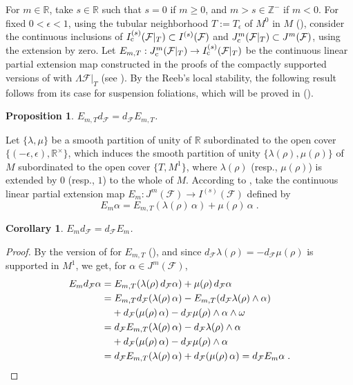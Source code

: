 \documentclass{memo-l}
\theoremstyle{plain}
\newtheorem{cor}[thm]{Corollary}
\newtheorem{prop}[thm]{Proposition}
\theoremstyle{definition}
\theoremstyle{remark}
\newcommand{\R}{\mathbb{R}}
\newcommand{\Z}{\mathbb{Z}}
\newcommand{\FF}{\mathcal{F}}
\newcommand{\co}{{\text{\rm c}}}
\numberwithin{section}{chapter}
\numberwithin{equation}{section}%
\begin{document}
For $m\in\R$, take $s\in\R$ such that $s=0$ if $m\ge0$, and $m>s\in\Z^-$ if $m<0$. For fixed $0<\epsilon<1$, using the tubular neighborhood $T:=T_\epsilon$ of $M^0$ in $M$ (), consider the continuous inclusions of $I^{(s)}_\co(\FF|_T)\subset I^{(s)}(\FF)$ and $J^m_\co(\FF|_T)\subset J^m(\FF)$, using the extension by zero. Let $E_{m,T}:J^m_\co(\FF|_T) \to I^{(s)}_\co(\FF|_T)$  be the continuous linear partial extension map constructed in the proofs of the compactly supported versions of  with $\Lambda\FF|_T$ (see ). By the Reeb's local stability, the following result follows from its case for suspension foliations, which will be proved in  ().

\begin{prop}\label{p: E_m T d_FF = d_FF E_m T}
$E_{m,T}d_\FF=d_\FF E_{m,T}$.
\end{prop}

Let $\{\lambda,\mu\}$ be a smooth partition of unity of $\R$ subordinated to the open cover $\{(-\epsilon,\epsilon),\R^\times\}$, which induces the smooth partition of unity $\{\lambda(\rho),\mu(\rho)\}$ of $M$ subordinated to the open cover $\{T, M^1\}$, where $\lambda(\rho)$ (resp., $\mu(\rho)$) is extended by $0$ (resp., $1$) to the whole of $M$. According to , take the continuous linear partial extension map $E_m:J^m(\FF)\to I^{(s)}(\FF)$ defined by
\begin{equation}\label{E_m alpha = E_m T(lambda(rho) alpha) + mu(rho) alpha}
E_m\alpha=E_{m,T}(\lambda(\rho)\,\alpha)+\mu(\rho)\,\alpha\;.
\end{equation}

\begin{cor}\label{c: E_m d_FF = d_FF E_m}
$E_md_\FF=d_\FF E_m$. 
\end{cor}

\begin{proof}
By the version of  for $E_{m,T}$ (), and since $d_\FF\lambda(\rho)=-d_\FF\mu(\rho)$ is supported in $M^1$, we get, for $\alpha\in J^m(\FF)$,
\begin{align*}
E_md_\FF\alpha&=E_{m,T}(\lambda(\rho)\,d_\FF\alpha)+\mu(\rho)\,d_\FF\alpha\\
&=E_{m,T}d_\FF(\lambda(\rho)\,\alpha)-E_{m,T}(d_\FF\lambda(\rho)\wedge\alpha)\\
&\phantom{={}}{}+d_\FF(\mu(\rho)\,\alpha)-d_\FF\mu(\rho)\wedge \alpha\wedge\omega\\
&=d_\FF E_{m,T}(\lambda(\rho)\,\alpha)-d_\FF\lambda(\rho)\wedge\alpha\\
&\phantom{={}}{}+d_\FF(\mu(\rho)\,\alpha)-d_\FF\mu(\rho)\wedge \alpha\\
&=d_\FF E_{m,T}(\lambda(\rho)\,\alpha)+d_\FF(\mu(\rho)\,\alpha)
=d_\FF E_m\alpha\;.\qedhere
\end{align*}
\end{proof}
\end{document}
